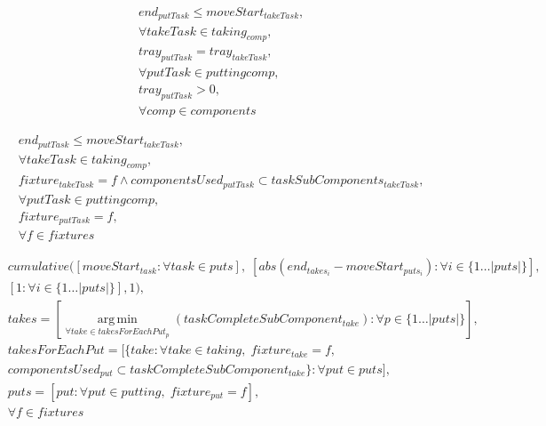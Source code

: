 \documentclass[10pt,a4paper]{report}
\begin{document}


\begin{align*}
&end_{putTask} \le moveStart_{takeTask},\\
&\forall takeTask \in taking_{comp},\\
&tray_{putTask} = tray_{takeTask},\\
&\forall putTask \in putting{comp},\\
&tray_{putTask} > 0,\\
&\forall comp \in components
\end{align*}



\begin{align*}
&end_{putTask} \le moveStart_{takeTask},\\
&\forall takeTask \in taking_{comp},\\
&fixture_{takeTask} = f \land componentsUsed_{putTask} \subset taskSubComponents_{takeTask},\\
&\forall putTask \in putting{comp},\\
&fixture_{putTask} = f,\\
&\forall f \in fixtures
\end{align*}


\begin{align*}
&cumulative([moveStart_{task} : \forall task \in puts],\; [abs(end_{takes_i}-moveStart_{puts_i}) : \forall i \in \{1 \ldots |puts|\}],\\
&[1 : \forall i \in \{1 \ldots |puts|\}], 1),\\
&takes = [\operatorname*{arg\,min}_{\forall take \in takesForEachPut_p}(taskCompleteSubComponent_{take}) : \forall p \in \{1 \ldots |puts|\}],\\
&takesForEachPut = [\{take : \forall take \in taking, \; fixture_{take} = f,\\
&componentsUsed_{put} \subset taskCompleteSubComponent_{take}\} : \forall put \in puts],\\
&puts = [put : \forall put \in putting, \; fixture_{put} = f],\\
&\forall f \in fixtures
\end{align*}
\end{document}
